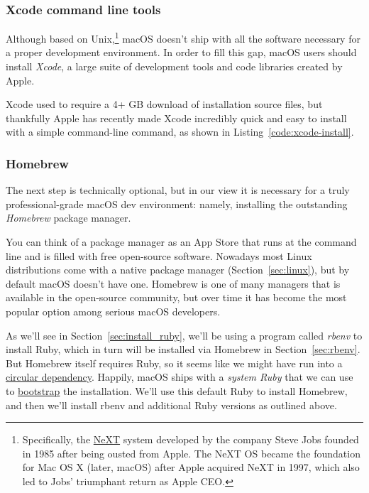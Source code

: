 \subsubsection{Xcode command line tools}
\label{sec:shiny_xcode}

Although based on Unix,\footnote{Specifically, the \href{https://en.wikipedia.org/wiki/NeXT}{NeXT} system developed by the company Steve Jobs founded in 1985 after being ousted from Apple. The NeXT OS became the foundation for Mac OS X (later, macOS) after Apple acquired NeXT in 1997, which also led to Jobs' triumphant return as Apple CEO\@.} macOS doesn't ship with all the software necessary for a proper development environment. In order to fill this gap, macOS users should install \emph{Xcode}, a large suite of development tools and code libraries created by Apple.

Xcode used to require a 4+ GB download of installation source files, but thankfully Apple has recently made Xcode incredibly quick and easy to install with a simple command-line command, as shown in Listing~\ref{code:xcode-install}.

\begin{codelisting}
\label{code:xcode-install}
\end{codelisting}


\subsubsection{Homebrew}
\label{sec:homebrew}

The next step is technically optional, but in our view it is necessary for a truly professional-grade macOS dev environment: namely, installing the outstanding \emph{Homebrew} package manager.

You can think of a package manager as an App Store that runs at the command line and is filled with free open-source software. Nowadays most Linux distributions come with a native package manager (Section~\ref{sec:linux}), but by default macOS doesn't have one. Homebrew is one of many managers that is available in the open-source community, but over time it has become the most popular option among serious macOS developers.

As we'll see in Section~\ref{sec:install_ruby}, we'll be using a program called \emph{rbenv} to install Ruby, which in turn will be installed via Homebrew in Section~\ref{sec:rbenv}. But Homebrew itself requires Ruby, so it seems like we might have run into a \href{https://en.wikipedia.org/wiki/Circular_dependency}{circular dependency}. Happily, macOS ships with a \emph{system Ruby} that we can use to \href{https://en.wikipedia.org/wiki/Bootstrapping}{bootstrap} the installation. We'll use this default Ruby to install Homebrew, and then we'll install rbenv and additional Ruby versions as outlined above.

